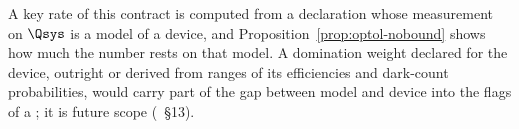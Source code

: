 
A key rate of this contract is computed from a declaration whose
measurement on $\Qsys$ is a model of a device, and
Proposition~\ref{prop:optol-nobound} shows how much the number rests on that
model. A domination weight declared for the device, outright or derived from
ranges of its efficiencies and dark-count probabilities, would carry part of
the gap between model and device into the flags of a ; it is
future scope (~\S13).

